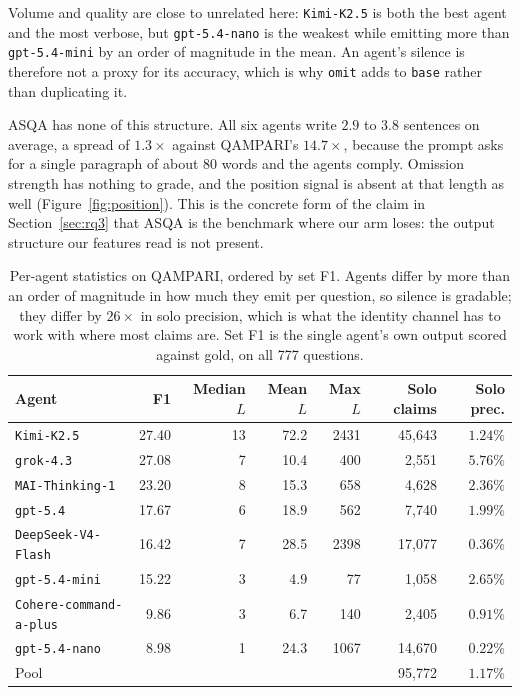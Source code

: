 \documentclass{article}
\begin{document}
Volume and quality are close to unrelated here: \texttt{Kimi-K2.5} is both the best agent and the most verbose, but \texttt{gpt-5.4-nano} is the weakest while emitting more than \texttt{gpt-5.4-mini} by an order of magnitude in the mean. An agent's silence is therefore not a proxy for its accuracy, which is why \texttt{omit} adds to \texttt{base} rather than duplicating it.

ASQA has none of this structure. All six agents write $2.9$ to $3.8$ sentences on average, a spread of $1.3\times$ against QAMPARI's $14.7\times$, because the prompt asks for a single paragraph of about 80 words and the agents comply. Omission strength has nothing to grade, and the position signal is absent at that length as well (Figure~\ref{fig:position}). This is the concrete form of the claim in Section~\ref{sec:rq3} that ASQA is the benchmark where our arm loses: the output structure our features read is not present.

\begin{table}
  \caption{Per-agent statistics on QAMPARI, ordered by set F1. Agents differ by more than an order of magnitude in how much they emit per question, so silence is gradable; they differ by $26\times$ in solo precision, which is what the identity channel has to work with where most claims are. Set F1 is the single agent's own output scored against gold, on all 777 questions.}
  \label{tab:lengths}
  \centering
  \begin{tabular}{lrrrrrr}
    \toprule
    Agent & F1 & Median $L$ & Mean $L$ & Max $L$ & Solo claims & Solo prec. \\
    \midrule
    \texttt{Kimi-K2.5}             & 27.40 & 13 & 72.2 & 2431 & 45,643 & $1.24\%$ \\
    \texttt{grok-4.3}              & 27.08 &  7 & 10.4 &  400 &  2,551 & $\mathbf{5.76\%}$ \\
    \texttt{MAI-Thinking-1}        & 23.20 &  8 & 15.3 &  658 &  4,628 & $2.36\%$ \\
    \texttt{gpt-5.4}               & 17.67 &  6 & 18.9 &  562 &  7,740 & $1.99\%$ \\
    \texttt{DeepSeek-V4-Flash}     & 16.42 &  7 & 28.5 & 2398 & 17,077 & $0.36\%$ \\
    \texttt{gpt-5.4-mini}          & 15.22 &  3 &  4.9 &   77 &  1,058 & $2.65\%$ \\
    \texttt{Cohere-command-a-plus} &  9.86 &  3 &  6.7 &  140 &  2,405 & $0.91\%$ \\
    \texttt{gpt-5.4-nano}          &  8.98 &  1 & 24.3 & 1067 & 14,670 & $0.22\%$ \\
    \midrule
    Pool                           &       &    &      &      & 95,772 & $1.17\%$ \\
    \bottomrule
  \end{tabular}
\end{table}
\end{document}
